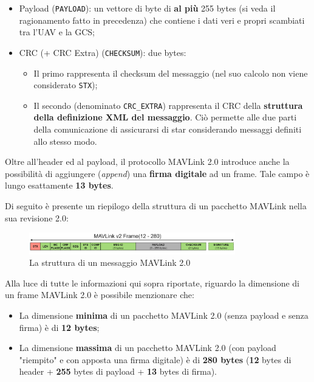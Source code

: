 \documentclass[a4paper, 12pt, oneside]{article}
\begin{document}
\begin{itemize}
    \item Payload (\texttt{PAYLOAD}): un vettore di byte di \textbf{al più} 255 bytes (si veda il ragionamento fatto in precedenza) che contiene i dati veri e propri scambiati tra l'UAV e la GCS;
    \item CRC (+ CRC Extra) (\texttt{CHECKSUM}): due bytes: \begin{itemize}
        \item Il primo rappresenta il checksum del messaggio (nel suo calcolo non viene considerato \texttt{STX});
        \item Il secondo (denominato \texttt{CRC\_EXTRA}) rappresenta il CRC della \textbf{struttura della definizione XML del messaggio}. Ciò permette alle due parti della comunicazione di assicurarsi di star considerando messaggi definiti allo stesso modo.
    \end{itemize}
\end{itemize}

Oltre all'header ed al payload, il protocollo MAVLink 2.0 introduce anche la possibilità di aggiungere (\textit{append}) una \textbf{firma digitale} ad un frame. Tale campo è lungo esattamente \textbf{13 bytes}.

\newpage

Di seguito è presente un riepilogo della struttura di un pacchetto MAVLink nella sua revisione 2.0:

\begin{figure}[H]
    \centering
    \includegraphics[width=0.8\textwidth]{images/packet_mavlink_v2.jpg}
    \caption{La struttura di un messaggio MAVLink 2.0}
\end{figure}

Alla luce di tutte le informazioni qui sopra riportate, riguardo la dimensione di un frame MAVLink 2.0 è possibile menzionare che:

\begin{itemize}
    \item La dimensione \textbf{minima} di un pacchetto MAVLink 2.0 (senza payload e senza firma) è di \textbf{12 bytes};
    \item La dimensione \textbf{massima} di un pacchetto MAVLink 2.0 (con payload "riempito" e con apposta una firma digitale) è di \textbf{280 bytes} (\textbf{12} bytes di header + \textbf{255} bytes di payload + \textbf{13} bytes di firma). 
\end{itemize}
\end{document}
